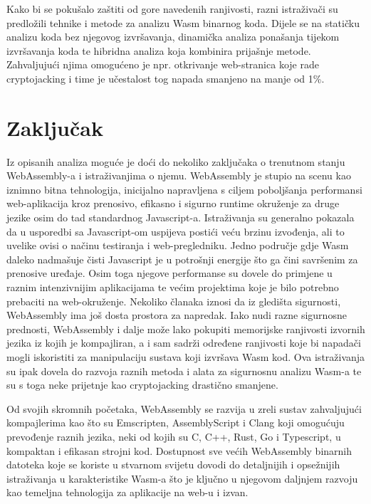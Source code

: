 \documentclass[seminarskirad]{fer}
\begin{document}
Kako bi se pokušalo zaštiti od gore navedenih ranjivosti, razni istraživači su predložili tehnike i metode za analizu Wasm binarnog koda. Dijele se na statičku analizu koda bez njegovog izvršavanja, dinamička analiza ponašanja tijekom izvršavanja koda te hibridna analiza koja kombinira prijašnje metode. Zahvaljujući njima omogućeno je npr. otkrivanje web-stranica koje rade cryptojacking i time je učestalost tog napada smanjeno na manje od 1\%.


\chapter{Zaključak}
\label{pog:zakljucak}

Iz opisanih analiza moguće je doći do nekoliko zaključaka o trenutnom stanju WebAssembly-a i istraživanjima o njemu. WebAssembly je stupio na scenu kao iznimno bitna tehnologija, inicijalno napravljena s ciljem poboljšanja performansi web-aplikacija kroz prenosivo, efikasno i sigurno runtime okruženje za druge jezike osim do tad standardnog Javascript-a. Istraživanja su generalno pokazala da u usporedbi sa Javascript-om uspijeva postići veću brzinu izvođenja, ali to uvelike ovisi o načinu testiranja i web-pregledniku. Jedno područje gdje Wasm daleko nadmašuje čisti Javascript je u potrošnji energije što ga čini savršenim za prenosive uređaje. Osim toga njegove performanse su dovele do primjene u raznim intenzivnijim aplikacijama te većim projektima koje je bilo potrebno prebaciti na web-okruženje. Nekoliko članaka iznosi da iz gledišta sigurnosti, WebAssembly ima još dosta prostora za napredak. Iako nudi razne sigurnosne prednosti, WebAssembly i dalje može lako pokupiti memorijske ranjivosti izvornih jezika iz kojih je kompajliran, a i sam sadrži određene ranjivosti koje bi napadači mogli iskoristiti za manipulaciju sustava koji izvršava Wasm kod. Ova istraživanja su ipak dovela do razvoja raznih metoda i alata za sigurnosnu analizu Wasm-a te su s toga neke prijetnje kao cryptojacking drastično smanjene.

Od svojih skromnih početaka, WebAssembly se razvija u zreli sustav zahvaljujući kompajlerima kao što su Emscripten, AssemblyScript i Clang koji omogućuju prevođenje raznih jezika, neki od kojih su C, C++, Rust, Go i Typescript, u kompaktan i efikasan strojni kod. Dostupnost sve većih WebAssembly binarnih datoteka koje se koriste u stvarnom svijetu dovodi do detaljnijih i opsežnijih istraživanja u karakteristike Wasm-a što je ključno u njegovom daljnjem razvoju kao temeljna tehnologija za aplikacije na web-u i izvan.








\backmatter
\end{document}

